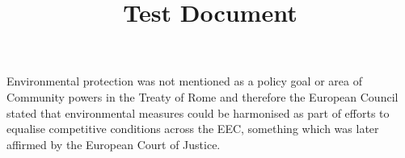 \documentclass[12pt, a4paper]{book}
\title{Test Document}
\begin{document}
 Environmental protection was not mentioned as a policy goal or area of Community powers in the Treaty of Rome and therefore the European Council stated that environmental measures could be harmonised as part of efforts to equalise competitive conditions across the EEC, something which was later affirmed by the European Court of Justice.\autocite[]{C91/79}  



\printindex
\end{document}
